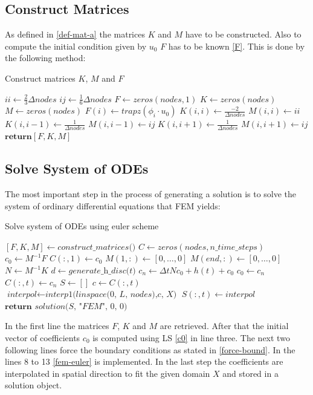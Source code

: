 \subsection{Construct Matrices}
As defined in \ref{def-mat-a}  the matrices \(K\) and \(M\) have to be constructed.
Also to compute the initial condition given by \(u_0\) \(F\) has to be known \ref{F}.
This is done by the following method:
\begin{algorithm}[H]
\caption{Construct matrices \(K\), \(M\) and \(F\)}
\begin{algorithmic}[1]
\State $ii \gets \frac{2}{3} \Delta nodes$
\State $ij \gets \frac{1}{6} \Delta nodes$
\State $F \gets zeros(nodes, 1)$
\State $K \gets zeros(nodes)$
\State $M \gets zeros(nodes)$
\State $F(i) \gets trapz(\phi_i \cdot u_0)$
\EndFor 
{}
\State $ K(i, i) \gets \frac{-2}{\Delta nodes}$
\State $ M(i, i) \gets ii$
\State $ K(i, i-1) \gets \frac{1}{\Delta nodes}$
\State $ M(i, i-1) \gets ij$
\EndIf
{}
\State $ K(i, i+1) \gets \frac{1}{\Delta nodes}$
\State $ M(i, i+1) \gets ij$
\EndIf
\EndFor 
\State $\textbf{return} [F, K, M]$
\end{algorithmic}
\end{algorithm}

\subsection{Solve System of ODEs}
The most important step in the process of generating a solution is to solve the system of ordinary differential equations that FEM yields:
\begin{algorithm}[H]
\caption{Solve system of ODEs using euler scheme}
\begin{algorithmic}[1]
\State $[F, K, M] \gets \textit{construct\_matrices()}$
\State $C \gets zeros(nodes, n\_time\_steps)$
\State $c_{0} \gets M^{-1}F$
\State $C(:, 1) \gets c_{0}$
\State $M(1, :) \gets [0, \hdots, 0]$
\State $M(end, :) \gets [0, \hdots, 0]$
\State $N \gets M^{-1}K$
\State $d \gets \textit{generate\_h\_disc(t)}$
\State $c_{n} \gets \Delta t N c_{0} + h(t) + c_{0} $
\State $c_{0} \gets c_{n}$
\State $C(:, t) \gets c_{n}$
\EndFor
\State $S \gets []$
\State $c \gets C(:, t)$
\State $\textit{interpol} \gets \textit{interp1(linspace(0, L, nodes),c, X)}$
\State $S(:, t) \gets \textit{interpol}$
\EndFor
\State $\textbf{return } \textit{solution(S, "FEM", 0, 0)}$
\end{algorithmic}
\end{algorithm}
In the first line the matrices \(F\), \(K\) and \(M\) are retrieved.
After that the initial vector of coefficients \(c_0\) is computed using LS \ref{c0} in line three.
The next two following lines force the boundary conditions as stated in \ref{force-bound}.
In the lines 8 to 13 \ref{fem-euler} is implemented.
In the last step the coefficients are interpolated in spatial direction to fit the given domain \(X\) and stored in a solution object.


	



